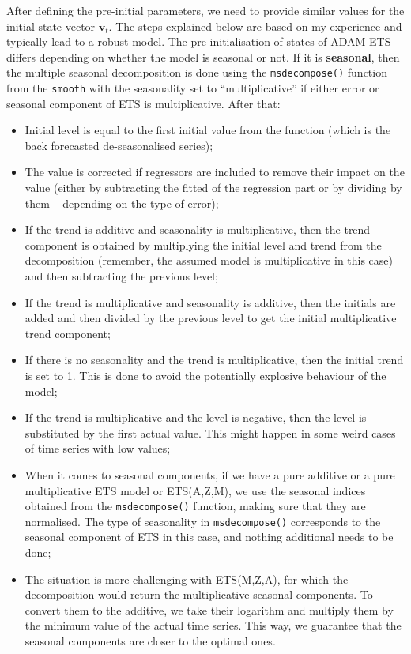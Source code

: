 \documentclass[
]{book}
\providecommand{\tightlist}{%
  \setlength{\itemsep}{0pt}\setlength{\parskip}{0pt}}
\theoremstyle{definition}
\theoremstyle{definition}
\theoremstyle{definition}
\theoremstyle{definition}
\theoremstyle{remark}
\begin{document}
After defining the pre-initial parameters, we need to provide similar values for the initial state vector \(\mathbf{v}_t\). The steps explained below are based on my experience and typically lead to a robust model. The pre-initialisation of states of ADAM ETS differs depending on whether the model is seasonal or not. If it is \textbf{seasonal}, then the multiple seasonal decomposition is done using the \texttt{msdecompose()} function from the \texttt{smooth} with the seasonality set to ``multiplicative'' if either error or seasonal component of ETS is multiplicative. After that:

\begin{itemize}
\tightlist
\item
  Initial level is equal to the first initial value from the function (which is the back forecasted de-seasonalised series);
\item
  The value is corrected if regressors are included to remove their impact on the value (either by subtracting the fitted of the regression part or by dividing by them -- depending on the type of error);
\item
  If the trend is additive and seasonality is multiplicative, then the trend component is obtained by multiplying the initial level and trend from the decomposition (remember, the assumed model is multiplicative in this case) and then subtracting the previous level;
\item
  If the trend is multiplicative and seasonality is additive, then the initials are added and then divided by the previous level to get the initial multiplicative trend component;
\item
  If there is no seasonality and the trend is multiplicative, then the initial trend is set to 1. This is done to avoid the potentially explosive behaviour of the model;
\item
  If the trend is multiplicative and the level is negative, then the level is substituted by the first actual value. This might happen in some weird cases of time series with low values;
\item
  When it comes to seasonal components, if we have a pure additive or a pure multiplicative ETS model or ETS(A,Z,M), we use the seasonal indices obtained from the \texttt{msdecompose()} function, making sure that they are normalised. The type of seasonality in \texttt{msdecompose()} corresponds to the seasonal component of ETS in this case, and nothing additional needs to be done;
\item
  The situation is more challenging with ETS(M,Z,A), for which the decomposition would return the multiplicative seasonal components. To convert them to the additive, we take their logarithm and multiply them by the minimum value of the actual time series. This way, we guarantee that the seasonal components are closer to the optimal ones.
\end{itemize}
\end{document}

